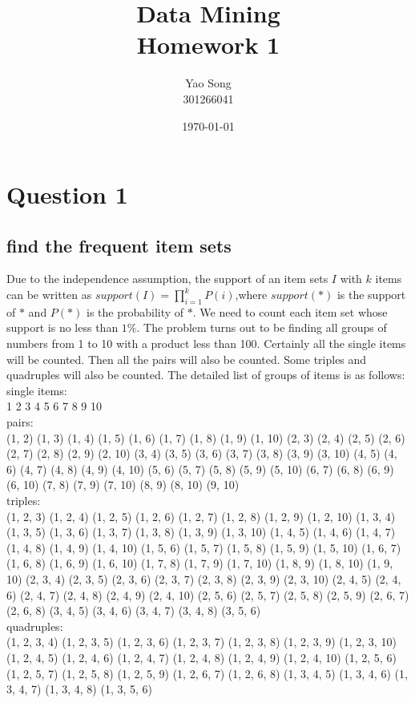 \documentclass[paper=a4, fontsize=13pt]{article} %
\title{	
Data Mining \\
Homework 1
}
\author{Yao Song\\301266041} %
\date{\normalsize\today} %
\begin{document}
\maketitle %


\section{Question 1}
\subsection{find the frequent item sets}
Due to the independence assumption, the support of an item sets $I$ with $k$ items can be written as 
$support(I)  = \prod_{i=1}^k P(i)$,where $support(\ast)$ is the support of $\ast$ and $P(\ast)$ is the probability of $\ast$.
We need to count each item set whose support is no less than $1\%$.
The problem turns out to be finding all groups of numbers from 1 to 10 with a product less than 100.
Certainly all the single items will be counted. Then all the pairs will also be counted.
Some triples and quadruples will also be counted. The detailed list of groups of items is as follows:\\
single items:\\
1 2 3 4 5 6 7 8 9 10\\
pairs:\\
(1, 2) (1, 3) (1, 4) (1, 5) (1, 6) (1, 7) (1, 8) (1, 9) (1, 10) (2, 3) (2, 4) (2, 5) (2, 6) (2, 7) (2, 8) (2, 9) (2, 10) (3, 4) (3, 5) (3, 6) (3, 7) (3, 8) (3, 9) (3, 10) (4, 5) (4, 6) (4, 7) (4, 8) (4, 9) (4, 10) (5, 6) (5, 7) (5, 8) (5, 9) (5, 10) (6, 7) (6, 8) (6, 9) (6, 10) (7, 8) (7, 9) (7, 10) (8, 9) (8, 10) (9, 10)\\
triples:\\
(1, 2, 3) (1, 2, 4) (1, 2, 5) (1, 2, 6) (1, 2, 7) (1, 2, 8) (1, 2, 9) (1, 2, 10) (1, 3, 4) (1, 3, 5) (1, 3, 6) (1, 3, 7) (1, 3, 8) (1, 3, 9) (1, 3, 10) (1, 4, 5) (1, 4, 6) (1, 4, 7) (1, 4, 8) (1, 4, 9) (1, 4, 10) (1, 5, 6) (1, 5, 7) (1, 5, 8) (1, 5, 9) (1, 5, 10) (1, 6, 7) (1, 6, 8) (1, 6, 9) (1, 6, 10) (1, 7, 8) (1, 7, 9) (1, 7, 10) (1, 8, 9) (1, 8, 10) (1, 9, 10) (2, 3, 4) (2, 3, 5) (2, 3, 6) (2, 3, 7) (2, 3, 8) (2, 3, 9) (2, 3, 10) (2, 4, 5) (2, 4, 6) (2, 4, 7) (2, 4, 8) (2, 4, 9) (2, 4, 10) (2, 5, 6) (2, 5, 7) (2, 5, 8) (2, 5, 9) (2, 6, 7) (2, 6, 8) (3, 4, 5) (3, 4, 6) (3, 4, 7) (3, 4, 8) (3, 5, 6)\\
quadruples:\\
(1, 2, 3, 4) (1, 2, 3, 5) (1, 2, 3, 6) (1, 2, 3, 7) (1, 2, 3, 8) (1, 2, 3, 9) (1, 2, 3, 10) (1, 2, 4, 5) (1, 2, 4, 6) (1, 2, 4, 7) (1, 2, 4, 8) (1, 2, 4, 9) (1, 2, 4, 10) (1, 2, 5, 6) (1, 2, 5, 7) (1, 2, 5, 8) (1, 2, 5, 9) (1, 2, 6, 7) (1, 2, 6, 8) (1, 3, 4, 5) (1, 3, 4, 6) (1, 3, 4, 7) (1, 3, 4, 8) (1, 3, 5, 6)
\end{document}
